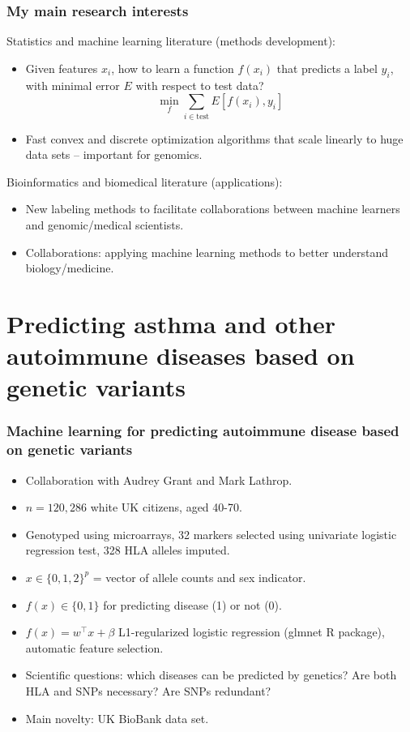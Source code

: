 \documentclass{beamer}
\begin{document}
\begin{frame}
  \frametitle{My main research interests}
  Statistics and machine learning literature (methods development):
  \begin{itemize}
  \item Given features $x_i$, how to learn a function $f(x_i)$ that predicts a
    label $y_i$, with minimal error $E$ with respect to test data? 
    $$
\min_f
\sum_{i\in\text{test}}
E[f(x_i), y_i]
$$
\item Fast convex and discrete optimization algorithms that scale
  linearly to huge data sets -- important for genomics.
  \end{itemize}
  Bioinformatics and biomedical literature (applications):
  \begin{itemize}
  \item New labeling methods to facilitate collaborations between
    machine learners and genomic/medical scientists.
  \item Collaborations: applying machine learning methods to
    better understand biology/medicine.
  \end{itemize}
\end{frame}

\section{Predicting asthma and other autoimmune diseases based on
  genetic variants}

\begin{frame}
  \frametitle{Machine learning for predicting autoimmune disease based on genetic variants}
  \begin{itemize}
  \item Collaboration with Audrey Grant and Mark Lathrop.
  \item $n=120,286$ white UK citizens, aged 40-70.
  \item Genotyped using microarrays, 32 markers selected using
    univariate logistic regression test, 328 HLA alleles imputed.
  \item $x\in\{0,1,2\}^p$ = vector of allele counts and sex indicator.
  \item $f(x)\in\{0,1\}$ for predicting disease (1) or not (0).
  \item $f(x)=w^\intercal x + \beta$ L1-regularized logistic
    regression (glmnet R package), automatic feature selection.
  \item Scientific questions: which diseases can be predicted by
    genetics? Are both HLA and SNPs necessary? Are SNPs redundant?
  \item Main novelty: UK BioBank data set.
  \end{itemize}
\end{frame}
\end{document}
